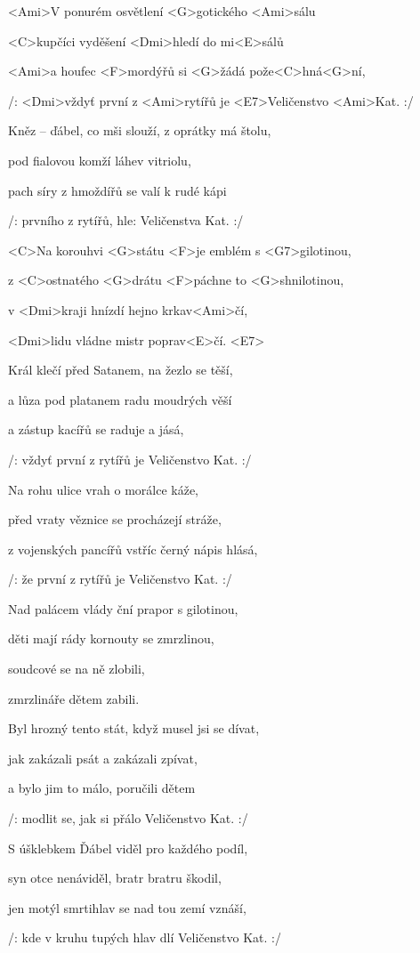 


\zs
<Ami>V ponurém osvětlení <G>gotického <Ami>sálu

<C>kupčíci vyděšení <Dmi>hledí do mi<E>sálů

<Ami>a houfec <F>mordýřů si <G>žádá pože<C>hná<G>ní,

/: <Dmi>vždyť první z <Ami>rytířů je <E7>Veličenstvo <Ami>Kat. :/
\ks

\zs
Kněz -- ďábel, co mši slouží, z oprátky má štolu,

pod fialovou komží láhev vitriolu,

pach síry z hmoždířů se valí k rudé kápi

/: prvního z rytířů, hle: Veličenstva Kat. :/
\ks

\zr
<C>Na korouhvi <G>státu <F>je emblém s <G7>gilotinou,

z <C>ostnatého <G>drátu <F>páchne to <G>shnilotinou,

v <Dmi>kraji hnízdí hejno krkav<Ami>čí,

<Dmi>lidu vládne mistr poprav<E>čí. <E7>
\kr

\zs
Král klečí před Satanem, na žezlo se těší,

a lůza pod platanem radu moudrých věší

a zástup kacířů se raduje a jásá,

/: vždyť první z rytířů je Veličenstvo Kat. :/
\ks

\zs
Na rohu ulice vrah o morálce káže,

před vraty věznice se procházejí stráže,

z vojenských pancířů vstříc černý nápis hlásá,

/: že první z rytířů je Veličenstvo Kat. :/
\ks

\zr
Nad palácem vlády ční prapor s gilotinou,

děti mají rády kornouty se zmrzlinou,

soudcové se na ně zlobili,

zmrzlináře dětem zabili.
\kr

\zs
Byl hrozný tento stát, když musel jsi se dívat,

jak zakázali psát a zakázali zpívat,

a bylo jim to málo, poručili dětem

/: modlit se, jak si přálo Veličenstvo Kat. :/
\ks

\zs
S úšklebkem Ďábel viděl pro každého podíl,

syn otce nenáviděl, bratr bratru škodil,

jen motýl smrtihlav se nad tou zemí vznáší,

/: kde v kruhu tupých hlav dlí Veličenstvo Kat. :/
\ks

\kp
